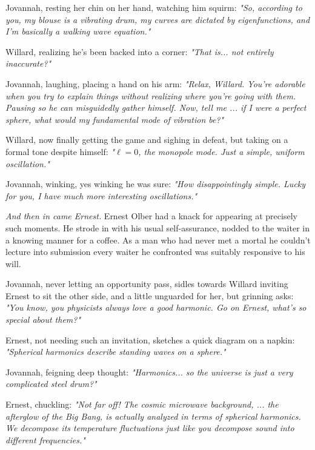 Jovannah, resting her chin on her hand, watching him squirm: \textit{"So, according to you, my blouse is a vibrating drum, my curves are dictated by eigenfunctions, and I’m basically a walking wave equation."}

Willard, realizing he's been backed into a corner: \textit{"That is... not entirely inaccurate?"}

Jovannah, laughing, placing a hand on his arm: \textit{"Relax, Willard. You’re adorable when you try to explain things without realizing where you're going with them. Pausing so he can misguidedly gather himself. Now, tell me ... if I were a perfect sphere, what would my fundamental mode of vibration be?"}

Willard, now finally getting the game and sighing in defeat, but taking on a formal tone despite himself: \textit{"$\ell = 0$, the monopole mode. Just a simple, uniform oscillation."}

Jovannah, winking, yes winking he was sure: \textit{"How disappointingly simple. Lucky for you, I have much more interesting oscillations."}
\bigskip

\textit{And then in came Ernest.}  Ernest Olber had a knack for appearing at precisely such moments. He strode in with his usual self-assurance, nodded to the waiter in a knowing manner for a coffee. As a man who had never met a mortal he couldn't lecture into submission every waiter he confronted was suitably responsive to his will.

Jovannah, never letting an opportunity pass, sidles towards Willard inviting Ernest to sit the other side, and a little unguarded for her, but grinning asks: \textit{"You know, you physicists always love a good harmonic. Go on Ernest, what’s so special about them?"}

\bigskip

Ernest, not needing such an invitation, sketches a quick diagram on a napkin: \textit{"Spherical harmonics describe standing waves on a sphere."}

\bigskip

Jovannah, feigning deep thought: \textit{"Harmonics... so the universe is just a very complicated steel drum?"}

\bigskip

Ernest, chuckling: \textit{"Not far off! The cosmic microwave background, ... the afterglow of the Big Bang, is actually analyzed in terms of spherical harmonics. We decompose its temperature fluctuations just like you decompose sound into different frequencies."}

